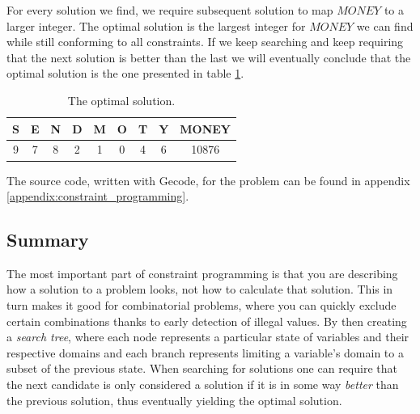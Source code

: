 For every solution we find, we require subsequent solution to map $MONEY$ to a larger
integer. The optimal solution is the largest integer for $MONEY$ we can find while still
conforming to all constraints. If we keep searching and keep requiring that the next solution
is better than the last we will eventually conclude that the optimal solution is the one
presented in table \ref{tab:optimal_solution}.

\begin{table}
	\centering
	\begin{tabular}{c|c|c|c|c|c|c|c|c}
		S & E & N & D & M & O & T & Y & MONEY \\
		\hline
		9 & 7 & 8 & 2 & 1 & 0 & 4 & 6 & 10876 \\
	\end{tabular}
	\caption{The optimal solution.}
	\label{tab:optimal_solution}
\end{table}

The source code, written with Gecode, for the problem can be found in appendix
\ref{appendix:constraint_programming}.

\subsection{Summary}
The most important part of constraint programming is that you are describing how a
solution to a problem looks, not how to calculate that solution. This in turn makes it
good for combinatorial problems, where you can quickly exclude certain combinations thanks
to early detection of illegal values. By then creating a \textit{search tree}, where each
node represents a particular state of variables and their respective domains and each
branch represents limiting a variable's domain to a subset of the previous state. When
searching for solutions one can require that the next candidate is only considered a solution
if it is in some way \textit{better} than the previous solution, thus eventually yielding
the optimal solution.
